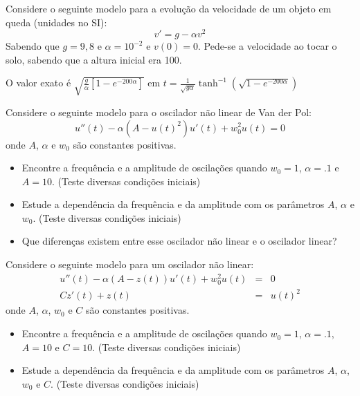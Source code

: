 \begin{exer} Considere o seguinte modelo para a evolução da velocidade de um objeto em queda (unidades no SI):
\begin{equation} v'=g-\alpha v^2 \end{equation}
Sabendo que $g=9,8$ e $\alpha=10^{-2}$ e $v(0)=0$. Pede-se a velocidade ao tocar o solo, sabendo que a altura inicial era 100.

\end{exer}
\begin{resp}

O valor exato é $\sqrt{\frac{g}{\alpha}\left[1-e^{{-200\alpha}}\right]}$ em $t=\frac{1}{\sqrt{g\alpha}}\tanh^{-1}\left(\sqrt{1-e^{{-200\alpha}}}\right)$

\end{resp}


\begin{exer} Considere o seguinte modelo para o oscilador não linear de Van der Pol:
\begin{equation} u''(t) - \alpha (A-u(t)^2)u'(t) + w_0^2u(t)=0 \end{equation}
onde $A$, $\alpha$ e $w_0$ são constantes positivas.
\begin{itemize}
\item Encontre a frequência e a amplitude de oscilações quando $w_0=1$, $\alpha=.1$ e $A=10$. (Teste diversas condições iniciais)
\item Estude a dependência da frequência e da amplitude com os parâmetros  $A$, $\alpha$ e $w_0$. (Teste diversas condições iniciais)
\item Que diferenças existem entre esse oscilador não linear e o oscilador linear?
\end{itemize}
\end{exer}

\begin{exer} Considere o seguinte modelo para um oscilador não linear:
\begin{eqnarray*}
u''(t)-\alpha(A-z(t))u'(t)+w_0^2 u(t)&=&0\\
Cz'(t)+z(t)&=&u(t)^2
\end{eqnarray*}
onde $A$, $\alpha$, $w_0$ e $C$ são constantes positivas.
\begin{itemize}
\item Encontre a frequência e a amplitude de oscilações quando $w_0=1$, $\alpha=.1$, $A=10$ e $C=10$. (Teste diversas condições iniciais)
\item Estude a dependência da frequência e da amplitude com os parâmetros  $A$, $\alpha$, $w_0$ e $C$. (Teste diversas condições iniciais)
\end{itemize}
\end{exer}

